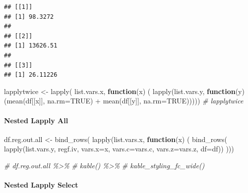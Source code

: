 \documentclass[
]{book}
\newenvironment{Shaded}{\begin{snugshade}}{\end{snugshade}}
\newcommand{\AttributeTok}[1]{\textcolor[rgb]{0.77,0.63,0.00}{#1}}
\newcommand{\CommentTok}[1]{\textcolor[rgb]{0.56,0.35,0.01}{\textit{#1}}}
\newcommand{\ConstantTok}[1]{\textcolor[rgb]{0.00,0.00,0.00}{#1}}
\newcommand{\ControlFlowTok}[1]{\textcolor[rgb]{0.13,0.29,0.53}{\textbf{#1}}}
\newcommand{\FunctionTok}[1]{\textcolor[rgb]{0.00,0.00,0.00}{#1}}
\newcommand{\NormalTok}[1]{#1}
\newcommand{\OtherTok}[1]{\textcolor[rgb]{0.56,0.35,0.01}{#1}}
\newcommand{\SpecialCharTok}[1]{\textcolor[rgb]{0.00,0.00,0.00}{#1}}
\begin{document}
\begin{verbatim}
## [[1]]
## [1] 98.3272
## 
## [[2]]
## [1] 13626.51
## 
## [[3]]
## [1] 26.11226
\end{verbatim}

\begin{Shaded}
\begin{Highlighting}[]
\NormalTok{lapplytwice }\OtherTok{\textless{}{-}} \FunctionTok{lapply}\NormalTok{(}
\NormalTok{  list.vars.x, }\ControlFlowTok{function}\NormalTok{(x) (}
    \FunctionTok{lapply}\NormalTok{(list.vars.y, }\ControlFlowTok{function}\NormalTok{(y) (}\FunctionTok{mean}\NormalTok{(df[[x]], }\AttributeTok{na.rm=}\ConstantTok{TRUE}\NormalTok{) }\SpecialCharTok{+}
                                       \FunctionTok{mean}\NormalTok{(df[[y]], }\AttributeTok{na.rm=}\ConstantTok{TRUE}\NormalTok{)))))}
\CommentTok{\# lapplytwice}
\end{Highlighting}
\end{Shaded}

\hypertarget{nested-lapply-all}{%
\paragraph{Nested Lapply All}\label{nested-lapply-all}}

\begin{Shaded}
\begin{Highlighting}[]
\NormalTok{df.reg.out.all }\OtherTok{\textless{}{-}} \FunctionTok{bind\_rows}\NormalTok{(}
  \FunctionTok{lapply}\NormalTok{(list.vars.x,}
         \ControlFlowTok{function}\NormalTok{(x) (}
           \FunctionTok{bind\_rows}\NormalTok{(}
             \FunctionTok{lapply}\NormalTok{(list.vars.y, regf.iv,}
                    \AttributeTok{vars.x=}\NormalTok{x, }\AttributeTok{vars.c=}\NormalTok{vars.c, }\AttributeTok{vars.z=}\NormalTok{vars.z, }\AttributeTok{df=}\NormalTok{df))}
\NormalTok{         )))}
\end{Highlighting}
\end{Shaded}

\begin{Shaded}
\begin{Highlighting}[]
\CommentTok{\# df.reg.out.all \%\textgreater{}\%}
\CommentTok{\#   kable() \%\textgreater{}\%}
\CommentTok{\#   kable\_styling\_fc\_wide()}
\end{Highlighting}
\end{Shaded}

\hypertarget{nested-lapply-select}{%
\paragraph{Nested Lapply Select}\label{nested-lapply-select}}
\end{document}
